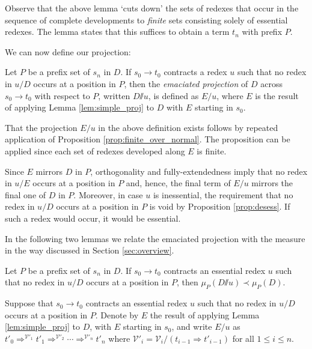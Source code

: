 \documentclass{LMCS}
\theoremstyle{definition}
\newcommand{\rew}{\rightarrow}
\newcommand{\emmy}{\mathord{\sslash}}
\newcommand{\dev}{\Rightarrow}
\newcommand{\pme}{\mu}
\newcommand{\pmep}[2]{\pme_{#1}({#2})}
\newcommand{\fscdp}[3]{{#1}'_0 \dev^{\mathcal{#2}'_1} {#1}'_1 \dev^{\mathcal{#2}'_2} \cdots \dev^{\mathcal{#2}'_{#3}} {#1}'_{#3}}
\begin{document}
Observe that the above lemma `cuts down' the sets of redexes that occur in the sequence of complete developments to \emph{finite} sets consisting solely of essential redexes. The lemma states that this suffices to obtain a term $t_n$ with prefix $P$.

We can now define our projection:
\begin{defi}
\label{def:emmy}
Let $P$ be a prefix set of $s_n$ in $D$. If $s_0 \rew t_0$ contracts a redex $u$ such that no redex in $u/D$ occurs at a position in $P$, then the \emph{emaciated projection} of $D$ across $s_0 \rew t_0$ with respect to $P$, written $D \emmy u$, is defined as $E/u$, where $E$ is the result of applying Lemma \ref{lem:simple_proj} to $D$ with $E$ starting in $s_0$.
\end{defi}

That the projection $E/u$ in the above definition exists follows by repeated application of Proposition \ref{prop:finite_over_normal}. The proposition can be applied since each set of redexes developed along $E$ is finite.

Since $E$ mirrors $D$ in $P$, orthogonality and fully-extendedness imply that no redex in $u/E$ occurs at a position in $P$ and, hence, the final term of $E/u$ mirrors the final one of $D$ in $P$. Moreover, in case $u$ is inessential, the requirement that no redex in $u/D$ occurs at a position in $P$ is void by Proposition \ref{prop:desess}. If such a redex would occur, it would be essential.

In the following two lemmas we relate the emaciated projection with the measure in the way discussed in Section \ref{sec:overview}.

\begin{lem}
\label{lem:essential_then_decrease}
Let $P$ be a prefix set of $s_n$ in $D$. If $s_0 \rew t_0$ contracts an essential redex $u$ such that no redex in $u/D$ occurs at a position in $P$, then $\pmep{P}{D \emmy u} \prec \pmep{P}{D}$.
\end{lem}

\proof
Suppose that $s_0 \rew t_0$ contracts an essential redex $u$ such that no redex in $u/D$ occurs at a position in $P$.  Denote by $E$ the result of applying Lemma \ref{lem:simple_proj} to $D$, with $E$ starting in $s_0$, and write $E/u$ as $\fscdp{t}{V}{n}$ where $\mathcal{V}'_i = \mathcal{V}_i / (t_{i - 1} \dev t'_{i - 1})$ for all $1 \leq i \leq n$.
\end{document}
